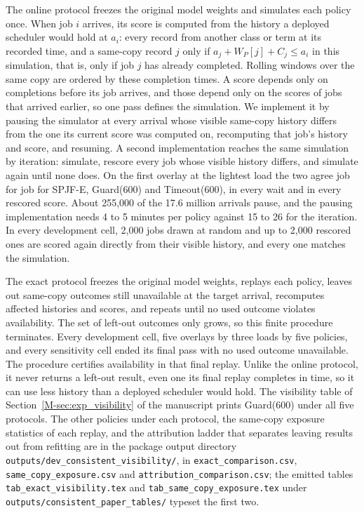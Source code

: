 \documentclass[mathematics,supfile,submit,moreauthors]{Definitions/mdpi}
\newcommand{\devnum}[1]{#1}
\begin{document}
The online protocol freezes the original model weights and simulates each policy once.
When job $i$ arrives, its score is computed from the history a deployed scheduler would
hold at $a_i$: every record from another class or term at its recorded time, and a
same-copy record $j$ only if $a_j+W_P[j]+C_j\le a_i$ in this simulation, that is, only if
job $j$ has already completed. Rolling windows over the same copy are ordered by these
completion times. A score depends only on completions before its job arrives, and those
depend only on the scores of jobs that arrived earlier, so one pass defines the
simulation. We implement it by pausing the simulator at every arrival whose visible
same-copy history differs from the one its current score was computed on, recomputing
that job's history and score, and resuming. A second implementation reaches the same
simulation by iteration: simulate, rescore every job whose visible history differs, and
simulate again until none does. On the first overlay at the lightest load the two agree
job for job for SPJF-E, Guard($\devnum{600}$) and Timeout($\devnum{600}$), in every wait
and in every rescored score. About \devnum{255{,}000} of the \devnum{17.6} million arrivals
pause, and the pausing implementation needs \devnum{4} to \devnum{5} minutes per policy
against \devnum{15} to \devnum{26} for the iteration. In every development cell,
\devnum{2{,}000} jobs drawn at random and up to \devnum{2{,}000} rescored ones are scored
again directly from their visible history, and every one matches the simulation.

The exact protocol freezes the original model weights, replays each policy, leaves out
same-copy outcomes still unavailable at the target arrival, recomputes affected
histories and scores, and repeats until no used outcome violates availability. The set
of left-out outcomes only grows, so this finite procedure terminates. Every development cell,
five overlays by three loads by five policies, and every sensitivity cell ended its
final pass with no used outcome unavailable. The procedure certifies availability in
that final replay. Unlike the online protocol, it never returns a left-out result, even
one its final replay completes in time, so it can use less history than a deployed
scheduler would hold. The visibility table of Section~\ref*{M-sec:exp_visibility}
of the manuscript prints Guard(600) under all five protocols. The other policies under
each protocol, the same-copy exposure statistics of each replay, and the attribution
ladder that separates leaving results out from refitting are in the package output directory
\texttt{outputs/dev\_consistent\_visibility/}, in \texttt{exact\_comparison.csv},
\texttt{same\_copy\_exposure.csv} and \texttt{attribution\_comparison.csv}; the
emitted tables \texttt{tab\_exact\_visibility.tex} and
\texttt{tab\_same\_copy\_exposure.tex} under \texttt{outputs/consistent\_paper\_tables/}
typeset the first two.
\end{document}
